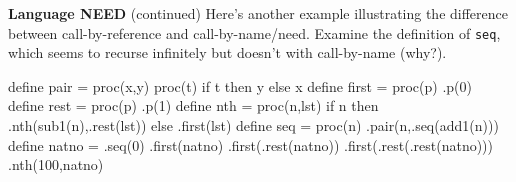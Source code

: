 \begin{minipage}[t]{\sw}
\slidenumber
\LARGE
{\bf Language NEED} (continued)\exx
Here's another example illustrating the difference
between call-by-reference and call-by-name/need.
Examine the definition of \verb.seq., which seems
to recurse infinitely but doesn't with call-by-name (why?).
\begin{qv}
define pair = proc(x,y)
  proc(t) if t then y else x
define first = proc(p) .p(0)
define rest = proc(p) .p(1)
define nth = proc(n,lst) %
  if n then .nth(sub1(n),.rest(lst)) else .first(lst)
define seq = proc(n) .pair(n,.seq(add1(n)))
define natno = .seq(0)  %
.first(natno)             %
.first(.rest(natno))       %
.first(.rest(.rest(natno))) %
.nth(100,natno)         %
\end{qv}
\end{minipage}
